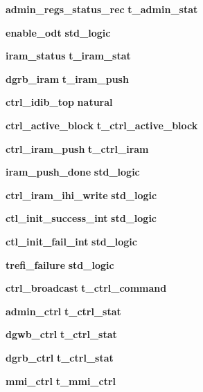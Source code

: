 \begin{DoxyCompactItemize}
{\bf admin\+\_\+regs\+\_\+status\+\_\+rec} {\bfseries \textcolor{vhdlchar}{t\+\_\+admin\+\_\+stat}\textcolor{vhdlchar}{ }} 
\item 
{\bf enable\+\_\+odt} {\bfseries \textcolor{comment}{std\+\_\+logic}\textcolor{vhdlchar}{ }} 
\item 
{\bf iram\+\_\+status} {\bfseries \textcolor{vhdlchar}{t\+\_\+iram\+\_\+stat}\textcolor{vhdlchar}{ }} 
\item 
{\bf dgrb\+\_\+iram} {\bfseries \textcolor{vhdlchar}{t\+\_\+iram\+\_\+push}\textcolor{vhdlchar}{ }} 
\item 
{\bf ctrl\+\_\+idib\+\_\+top} {\bfseries \textcolor{comment}{natural}\textcolor{vhdlchar}{ }} 
\item 
{\bf ctrl\+\_\+active\+\_\+block} {\bfseries \textcolor{vhdlchar}{t\+\_\+ctrl\+\_\+active\+\_\+block}\textcolor{vhdlchar}{ }} 
\item 
{\bf ctrl\+\_\+iram\+\_\+push} {\bfseries \textcolor{vhdlchar}{t\+\_\+ctrl\+\_\+iram}\textcolor{vhdlchar}{ }} 
\item 
{\bf iram\+\_\+push\+\_\+done} {\bfseries \textcolor{comment}{std\+\_\+logic}\textcolor{vhdlchar}{ }} 
\item 
{\bf ctrl\+\_\+iram\+\_\+ihi\+\_\+write} {\bfseries \textcolor{comment}{std\+\_\+logic}\textcolor{vhdlchar}{ }} 
\item 
{\bf ctl\+\_\+init\+\_\+success\+\_\+int} {\bfseries \textcolor{comment}{std\+\_\+logic}\textcolor{vhdlchar}{ }} 
\item 
{\bf ctl\+\_\+init\+\_\+fail\+\_\+int} {\bfseries \textcolor{comment}{std\+\_\+logic}\textcolor{vhdlchar}{ }} 
\item 
{\bf trefi\+\_\+failure} {\bfseries \textcolor{comment}{std\+\_\+logic}\textcolor{vhdlchar}{ }} 
\item 
{\bf ctrl\+\_\+broadcast} {\bfseries \textcolor{vhdlchar}{t\+\_\+ctrl\+\_\+command}\textcolor{vhdlchar}{ }} 
\item 
{\bf admin\+\_\+ctrl} {\bfseries \textcolor{vhdlchar}{t\+\_\+ctrl\+\_\+stat}\textcolor{vhdlchar}{ }} 
\item 
{\bf dgwb\+\_\+ctrl} {\bfseries \textcolor{vhdlchar}{t\+\_\+ctrl\+\_\+stat}\textcolor{vhdlchar}{ }} 
\item 
{\bf dgrb\+\_\+ctrl} {\bfseries \textcolor{vhdlchar}{t\+\_\+ctrl\+\_\+stat}\textcolor{vhdlchar}{ }} 
\item 
{\bf mmi\+\_\+ctrl} {\bfseries \textcolor{vhdlchar}{t\+\_\+mmi\+\_\+ctrl}\textcolor{vhdlchar}{ }} 
\item 

\end{DoxyCompactItemize}
